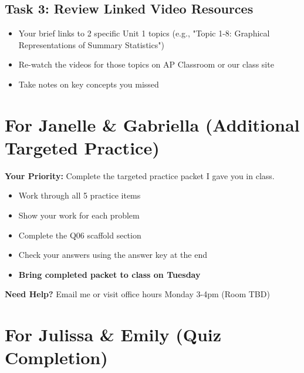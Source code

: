 \documentclass[12pt]{article}
\begin{document}
\subsection*{Task 3: Review Linked Video Resources}

\begin{itemize}[leftmargin=*]
    \item Your brief links to 2 specific Unit 1 topics (e.g., "Topic 1-8: Graphical Representations of Summary Statistics")
    \item Re-watch the videos for those topics on AP Classroom or our class site
    \item Take notes on key concepts you missed
\end{itemize}

\vspace{0.2in}

\section*{For Janelle \& Gabriella (Additional Targeted Practice)}

\begin{tcolorbox}[colback=yellow!10!white,colframe=orange!75!black]
\textbf{Your Priority:} Complete the targeted practice packet I gave you in class.

\begin{itemize}[leftmargin=*]
    \item Work through all 5 practice items
    \item Show your work for each problem
    \item Complete the Q06 scaffold section
    \item Check your answers using the answer key at the end
    \item \textbf{Bring completed packet to class on Tuesday}
\end{itemize}

\textbf{Need Help?} Email me or visit office hours Monday 3-4pm (Room TBD)
\end{tcolorbox}

\vspace{0.2in}

\section*{For Julissa \& Emily (Quiz Completion)}
\end{document}
